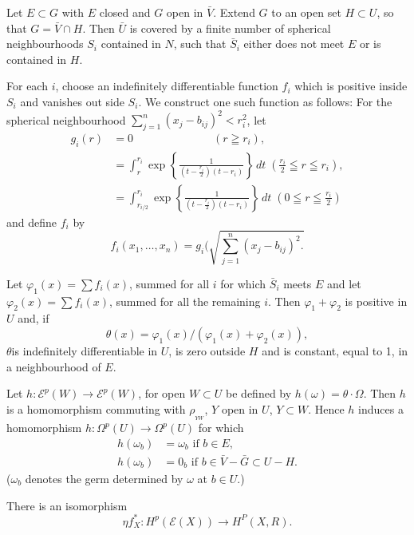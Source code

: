 Let $ E \subset G $ with $E$ closed and $G$ open in $\bar{V}
$. Extend $G$ to an open set $ H \subset U $, so that $ G = \bar{V}
\cap H $. Then $ \bar{U} $ is covered by a finite number of spherical
neighbourhoods $S_i$ contained in $N$, such that $ \bar{S}_i $ either
does not meet $E$ or is contained in $H$. 

For each $i$, choose an indefinitely differentiable function $f_i$
which is positive inside $S_i$ and vanishes  out side $S_i $. We
construct one such function as follows: For the spherical
neighbourhood $ \sum\limits^n_{j=1} ( x_j - b_{ij} )^2 < r^2_i$, let  
\begin{align*}
g_i (r) &= 0  \hspace{3cm } (r \geqq r_i),\\ 
&= \int^{r_i}_r \exp \left\{ \frac{1}{(t - \frac{r_i}{2})
  (t-r_i)}\right\} \,dt\; ( \frac{r_i}{2} \leqq r \leqq r_i), \\ 
&= \int^{r_i}_{r_{i/2}} \exp \left\{ \frac{1}{(t - \frac{r_i}{2})
  (t-r_i)}\right\} \, dt \; (0 \leqq r \leqq \frac{r_i}{2}) 
\end{align*}
and define $f_i$ by 
$$
f_i ( x_1, \ldots, x_n ) = g_i ( \sqrt{\sum^n_{j=1}  ( x_j -
  b_{ij})^2. }  
$$

Let $\varphi_1 (x) = \sum f_i (x)$, summed  for all $i$ for which $
\bar{S}_i $ meets $E$ and let $ \varphi_2 (x) = \sum f_i (x) $, summed
for all the remaining $i$. Then $ \varphi_1 + \varphi_2 $ is
positive in $ U $ and, if 
$$
\theta (x) = \varphi_1 (x) / ( \varphi_1 (x) + \varphi_2 (x) ), 
$$
$\theta$\pageoriginale is indefinitely differentiable in $U$, is zero
outside $H$ and is constant, equal to 1, in a neighbourhood of $E$.  

Let $ h :  \mathscr{E}^p (W) \rightarrow \mathscr{E}^p (W) $, for open
$ W \subset U $ be defined by $ h (\omega ) = \theta \cdot \Omega $. Then
$h$ is a homomorphism commuting with $ \rho_{_{YW}}$, $Y $ open in $ U$,  $Y
\subset W $. Hence $h$ induces a homomorphism $ h : \Omega^p (U)
\rightarrow \Omega^p (U) $ for which 
\begin{align*}
 h ( \omega_b ) &=  \omega_b \text{ if } b \in E, \\
  h ( \omega_b ) &=  0_b \text{ if } b \in \bar{V} - \bar{G} \subset U
  -H . 
\end{align*}
 ($\omega_b $ denotes the germ determined by $ \omega $ at $ b \in U$.) 

\begin{proposition}%
There is an isomorphism
$$
\eta f^*_X : H^p ( \mathscr{E} (X) ) \rightarrow H^P  ( X, R ). 
$$
\end{proposition}

